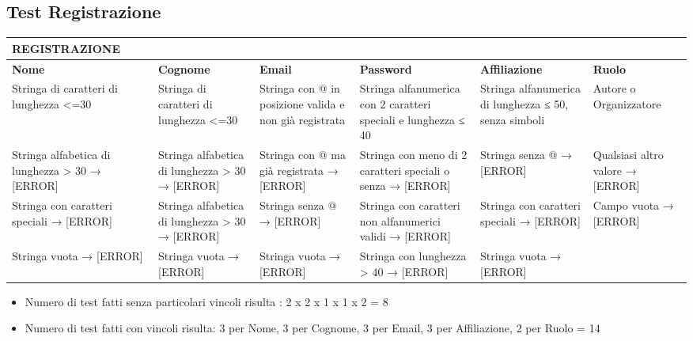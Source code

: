 \subsection{Test Registrazione}
\label{sec:test_registrazione}

\begin{tabular}{|p{3.5cm}|p{2cm}|p{2cm}|p{3cm}|p{2cm}|p{2cm}|}
\hline
\rowcolor{SkyBlue}
\textbf{REGISTRAZIONE} & & & & &\\
\hline
\rowcolor{Red}
\textbf{Nome} & \textbf{Cognome} & \textbf{Email} & \textbf{Password} & \textbf{Affiliazione} & \textbf{Ruolo}  \\
\hline
Stringa di caratteri di lunghezza <=30 & Stringa di caratteri di lunghezza <=30 & Stringa con @ in posizione valida e non già registrata & Stringa alfanumerica con 2 caratteri speciali e lunghezza ≤ 40 & Stringa alfanumerica di lunghezza ≤ 50, senza simboli & Autore o Organizzatore \\
\hline
Stringa alfabetica di lunghezza > 30 → [ERROR] & Stringa alfabetica di lunghezza > 30 → [ERROR] & Stringa con @ ma già registrata → [ERROR] & Stringa con meno di 2 caratteri speciali o senza → [ERROR] & Stringa senza @ → [ERROR] & Qualsiasi altro valore → [ERROR] \\
\hline
Stringa con caratteri speciali → [ERROR] & Stringa alfabetica di lunghezza > 30 → [ERROR] & Stringa senza @ → [ERROR] & Stringa con caratteri non alfanumerici validi → [ERROR] & Stringa con caratteri speciali → [ERROR] & Campo vuota → [ERROR]  \\
\hline
Stringa vuota → [ERROR] & Stringa vuota → [ERROR] & Stringa vuota → [ERROR] & Stringa con lunghezza > 40 → [ERROR] & Stringa vuota → [ERROR] &\\
\hline
\end{tabular}

\begin{itemize}
\item Numero di test fatti senza particolari vincoli risulta : 2 x 2 x 1 x 1 x 2 = 8
\item  Numero di test fatti con vincoli risulta: 3 per Nome, 3 per Cognome, 3 per Email, 3 per Affiliazione, 2 per Ruolo = 14 
\end{itemize}

